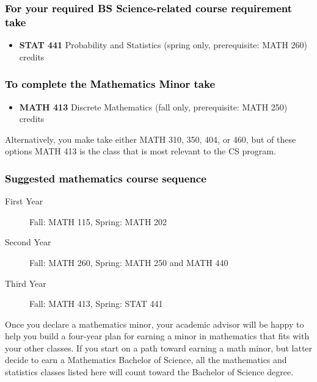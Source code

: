 \documentclass[10pt]{article}
\newenvironment{mypar}[2]
   {\begin{list}{}%
     {\setlength\leftmargin{#1}
     \setlength\rightmargin{#2}}
     \item[]}
   {\end{list}}
\newcommand{\discrete}{\textbf{MATH 413} Discrete Mathematics  (fall only, prerequisite: MATH 250)\dotfill 3 credits}
\newcommand{\statistics}{\textbf{STAT 441} Probability and Statistics (spring only, prerequisite: MATH 260)  \dotfill  3 credits}
\begin{document}
\subsubsection*{\textcolor{black}{For your required BS Science-related course requirement take}}
\begin{itemize}
\item \statistics
\end{itemize}
\vspace{-0.1in}
\subsubsection*{\textcolor{black}{To complete the Mathematics Minor  take}}
\begin{itemize}
\item \discrete
\end{itemize}
\vspace{-0.1in}
\begin{mypar}{0.5cm}{0.5cm}
Alternatively, you make take either MATH 310, 350, 404, or 460, but of these options MATH 413 is  the class that is most relevant to the CS program.  
\end{mypar}

\vspace{-0.1in}
\subsubsection*{\textcolor{black}{Suggested mathematics course sequence}}

\begin{description}
   \item[\phantom{xxx} First Year] Fall: MATH 115, Spring:  MATH 202
      \item[\phantom{xxx} Second Year]  Fall: MATH 260,  Spring: MATH 250  and MATH 440
     \item[\phantom{xxx} Third Year]  Fall: MATH 413,  Spring: STAT 441
 \end{description}
 \vspace{0.1in}
\noindent Once you declare a mathematics minor, your academic advisor will be happy to help you build a four-year plan for earning a minor in mathematics that fits with your other classes.  If you start on a path toward earning a math minor, but latter decide to earn a  Mathematics Bachelor of Science, all the mathematics and statistics  classes listed here will count toward the Bachelor of Science degree.



\newpage
\end{document}
